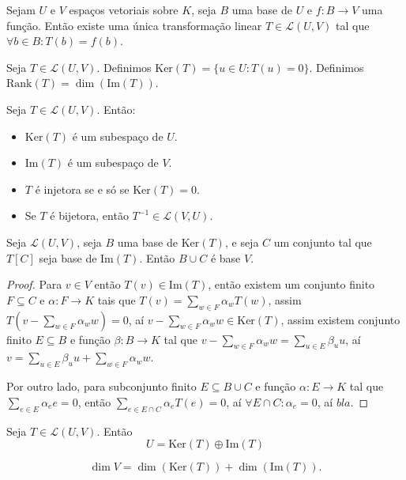 \documentclass[11pt,twoside,a4paper]{book}
\begin{document}
\begin{teorema}
Sejam $U$ e $V$ espaços vetoriais sobre $K$, seja $B$ uma base de $U$ e $f:B\rightarrow V$ uma função. Então existe uma única transformação linear $T\in\mathcal{L}(U,V)$ tal que $\forall b\in B:T(b)=f(b)$.
\end{teorema}

\begin{definicao}
Seja $T\in\mathcal{L}(U,V)$. Definimos $\mathrm{Ker}(T)=\{u\in U:T(u)=0\}$. Definimos $\mathrm{Rank}(T)=\dim(\mathrm{Im}(T))$.
\end{definicao}

\begin{proposicao}
Seja $T\in\mathcal{L}(U,V)$. Então:
\begin{itemize}
\item $\mathrm{Ker}(T)$ é um subespaço de $U$.
\item $\mathrm{Im}(T)$ é um subespaço de $V$.
\item $T$ é injetora se e só se $\mathrm{Ker}(T)=0$.
\item Se $T$ é bijetora, então $T^{-1}\in\mathcal{L}(V,U)$.
\end{itemize}
\end{proposicao}

\begin{teorema}
Seja $\mathcal{L}(U,V)$, seja $B$ uma base de $\mathrm{Ker}(T)$, e seja $C$ um conjunto tal que $T[C]$ seja base de $\mathrm{Im}(T)$. Então $B\cup C$ é base $V$.
\end{teorema}
\begin{proof}
Para $v\in V$ então $T(v)\in\mathrm{Im}(T)$, então existem um conjunto finito $F\subseteq C$ e $\alpha:F\rightarrow K$ tais que $T(v)=\sum\limits_{w\in F}\alpha_wT(w)$, assim $T\left(v-\sum\limits_{w\in F}\alpha_ww\right)=0$, aí $v-\sum\limits_{w\in F}\alpha_ww\in\mathrm{Ker}(T)$, assim existem conjunto finito $E\subseteq B$ e função $\beta:B\rightarrow K$ tal que $v-\sum\limits_{w\in F}\alpha_ww=\sum\limits_{u\in E}\beta_uu$, aí $v=\sum\limits_{u\in E}\beta_uu+\sum\limits_{w\in F}\alpha_ww$.

\medskip
\noindent
Por outro lado, para subconjunto finito $E\subseteq B\cup C$ e função $\alpha:E\rightarrow K$ tal que $\sum_{e\in E}\alpha_ee=0$, então $\sum_{e\in E\cap C}\alpha_eT(e)=0$, aí $\forall E\cap C:\alpha_e=0$, aí $bla$. 
\end{proof}

\begin{teorema} 
Seja $T \in \mathcal{L}(U,V).$ Então
\[
U = \mathrm{Ker}(T) \oplus \mathrm{Im}(T)
\]

\end{teorema}
\begin{corolario}
\[
\dim V=\dim(\mathrm{Ker}(T))+\dim(\mathrm{Im}(T)).
\]
\end{corolario}
\end{document}

